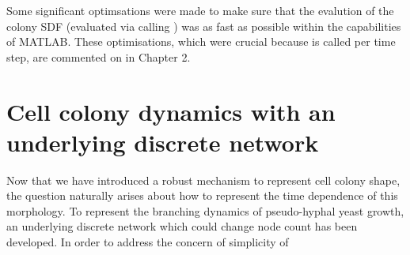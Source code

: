 Some significant optimsations were made to make sure that the evalution of 
the colony SDF (evaluated via calling ) was as fast as 
possible within the capabilities of MATLAB. These 
optimisations, which were crucial because  is called per time step, 
are commented on in Chapter 2.

\section{Cell colony dynamics with an underlying discrete network}
Now that we have introduced a robust mechanism to represent cell colony 
shape, the question naturally arises about how to represent the time dependence of this 
morphology. To represent the branching dynamics of pseudo-hyphal yeast growth, 
an underlying discrete network which could change node count has been developed.
In order to address the concern of simplicity of 









